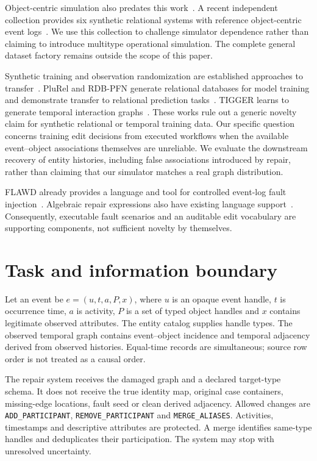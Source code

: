 \documentclass[11pt]{article}
\begin{document}
Object-centric simulation also predates this work~\cite{ocsim}. A recent independent collection provides six synthetic relational systems with reference object-centric event logs~\cite{relationalocel}. We use this collection to challenge simulator dependence rather than claiming to introduce multitype operational simulation. The complete general dataset factory remains outside the scope of this paper.

Synthetic training and observation randomization are established approaches to transfer~\cite{domainrandomization}. PluRel and RDB-PFN generate relational databases for model training and demonstrate transfer to relational prediction tasks~\cite{plurel,rdbpfn}. TIGGER learns to generate temporal interaction graphs~\cite{tigger}. These works rule out a generic novelty claim for synthetic relational or temporal training data. Our specific question concerns training edit decisions from executed workflows when the available event--object associations themselves are unreliable. We evaluate the downstream recovery of entity histories, including false associations introduced by repair, rather than claiming that our simulator matches a real graph distribution.

FLAWD already provides a language and tool for controlled event-log fault injection~\cite{flawd}. Algebraic repair expressions also have existing language support~\cite{repairlanguage}. Consequently, executable fault scenarios and an auditable edit vocabulary are supporting components, not sufficient novelty by themselves.

\section{Task and information boundary}
Let an event be $e=(u,t,a,P,x)$, where $u$ is an opaque event handle, $t$ is occurrence time, $a$ is activity, $P$ is a set of typed object handles and $x$ contains legitimate observed attributes. The entity catalog supplies handle types. The observed temporal graph contains event--object incidence and temporal adjacency derived from observed histories. Equal-time records are simultaneous; source row order is not treated as a causal order.

The repair system receives the damaged graph and a declared target-type schema. It does not receive the true identity map, original case containers, missing-edge locations, fault seed or clean derived adjacency. Allowed changes are \texttt{ADD\_PARTICIPANT}, \texttt{REMOVE\_PARTICIPANT} and \texttt{MERGE\_ALIASES}. Activities, timestamps and descriptive attributes are protected. A merge identifies same-type handles and deduplicates their participation. The system may stop with unresolved uncertainty.
\end{document}
